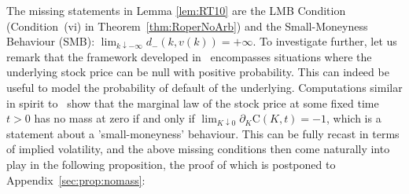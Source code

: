 \documentclass{amsart}[11pt]
\numberwithin{equation}{section}
\theoremstyle{definition}
\begin{document}
The missing statements in Lemma \ref{lem:RT10} are the LMB Condition (Condition~(vi) in Theorem~\ref{thm:RoperNoArb}) and
the Small-Moneyness Behaviour (SMB):
$\lim_{k\downarrow -\infty} d_-(k, v(k))=+\infty$.
To investigate
further, let us remark that the framework developed in~\cite{roper} encompasses situations where the underlying stock price can be null with positive probability. 
This can indeed be useful to model the probability of default of the underlying. 
Computations similar in spirit to~\cite{roper} show that the marginal law of the stock price at some fixed time $t>0$ 
has no mass at zero if and only if
$\lim_{K \downarrow 0}\partial_K\mathrm{C}(K, t) = -1$,
which is a statement about a 'small-moneyness' behaviour.
This can be fully recast in terms of implied volatility, and the above missing conditions then come naturally into play
in the following proposition, the proof of which is postponed to Appendix~\ref{sec:prop:nomass}:
\end{document}
